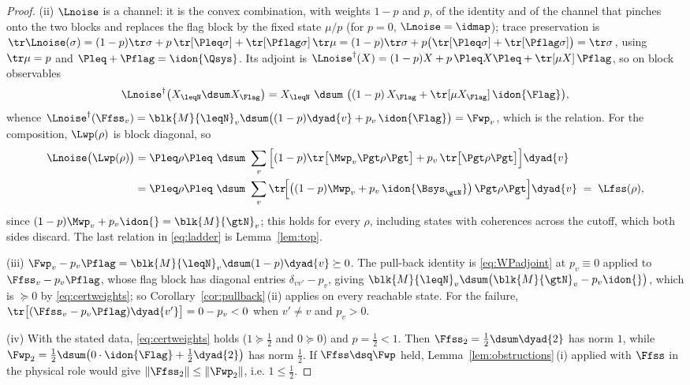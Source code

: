 \begin{proof}
(ii) $\Lnoise$ is a channel: it is the convex combination, with weights $1-p$
and $p$, of the identity and of the channel that pinches onto the two blocks
and replaces the flag block by the fixed state $\mu/p$ (for $p=0$,
$\Lnoise=\idmap$); trace preservation is
$\tr\Lnoise(\sigma)=(1-p)\tr\sigma+p\,\tr[\Pleq\sigma]
+\tr[\Pflag\sigma]\,\tr\mu
=(1-p)\tr\sigma+p\big(\tr[\Pleq\sigma]+\tr[\Pflag\sigma]\big)=\tr\sigma$,
using $\tr\mu=p$ and $\Pleq+\Pflag=\idon{\Qsys}$. Its adjoint is
$\Lnoise^{\dagger}(X)=(1-p)X+p\,\Pleq X\Pleq+\tr[\mu X]\,\Pflag$, so on block
observables
\begin{equation}\label{eq:L2adjoint}
  \Lnoise^{\dagger}\big(X_{\leqN}\dsum X_{\Flag}\big)
  = X_{\leqN}\ \dsum\
    \big((1-p)\,X_{\Flag}+\tr[\mu X_{\Flag}]\,\idon{\Flag}\big),
\end{equation}
whence $\Lnoise^{\dagger}(\Ffss_v)
=\blk{M}{\leqN}_v\dsum\big((1-p)\dyad{v}+p_v\,\idon{\Flag}\big)=\Fwp_v$, which
is the relation. For the composition, $\Lwp(\rho)$ is block diagonal, so
\begin{align*}
  \Lnoise\big(\Lwp(\rho)\big)
  &=\Pleq\rho\Pleq\ \dsum\
    \sum_v\Big[(1-p)\tr\big[\Mwp_v\Pgt\rho\Pgt\big]
      +p_v\,\tr\big[\Pgt\rho\Pgt\big]\Big]\dyad{v}\\
  &=\Pleq\rho\Pleq\ \dsum\
    \sum_v\tr\!\Big[\big((1-p)\Mwp_v+p_v\,\idon{\Bsys_{\gtN}}\big)\,
      \Pgt\rho\Pgt\Big]\dyad{v}
   \;=\;\Lfss(\rho),
\end{align*}
since $(1-p)\Mwp_v+p_v\idon{}=\blk{M}{\gtN}_v$; this holds for every $\rho$,
including states with coherences across the cutoff, which both sides discard.
The last relation in \eqref{eq:ladder} is Lemma~\ref{lem:top}.

(iii) $\Fwp_v-p_v\Pflag
=\blk{M}{\leqN}_v\dsum(1-p)\dyad{v}\succeq0$. The pull-back identity is
\eqref{eq:WPadjoint} at $p_v\equiv0$ applied to $\Ffss_v-p_v\Pflag$, whose
flag block has diagonal entries $\delta_{vv'}-p_v$, giving
$\blk{M}{\leqN}_v\dsum\big(\blk{M}{\gtN}_v-p_v\idon{}\big)$, which is
$\succeq0$ by \eqref{eq:certweights}; so
Corollary~\ref{cor:pullback}\,(ii) applies on every reachable state. For the
failure, $\tr\big[(\Ffss_v-p_v\Pflag)\dyad{v'}\big]=0-p_v<0$ when $v'\ne v$ and
$p_v>0$.

(iv) With the stated data, \eqref{eq:certweights} holds ($1\succeq\tfrac12$ and
$0\succeq0$) and $p=\tfrac12<1$. Then
$\Ffss_2=\tfrac12\dsum\dyad{2}$ has norm $1$, while
$\Fwp_2=\tfrac12\dsum\big(0\cdot\idon{\Flag}+\tfrac12\dyad{2}\big)$ has norm
$\tfrac12$. If $\Ffss\dsq\Fwp$ held, Lemma~\ref{lem:obstructions}\,(i) applied
with $\Ffss$ in the physical role would give $\|\Ffss_2\|\le\|\Fwp_2\|$, i.e.
$1\le\tfrac12$.
\end{proof}
